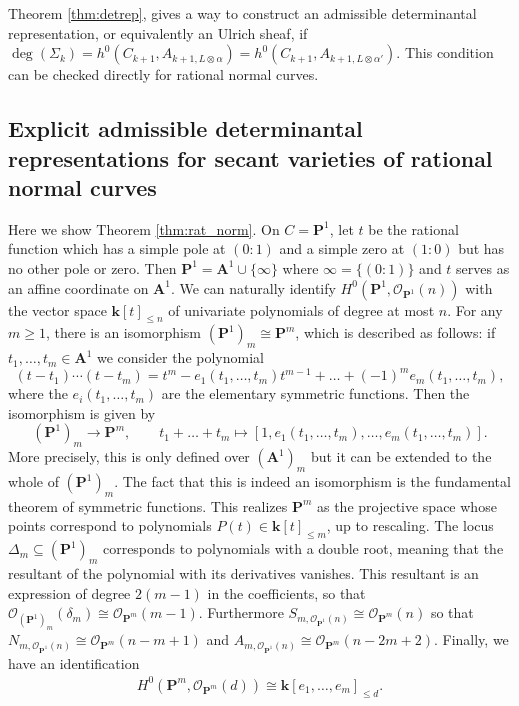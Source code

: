 \documentclass[12pt]{amsart}
\numberwithin{equation}{section}
\numberwithin{thmcounter}{section}
\theoremstyle{definition}
\theoremstyle{claim}
\newcommand{\kk}{\mathbf{k}}
\newcommand{\nP}{\mathbf{P}}
\newcommand{\nA}{\mathbf{A}}
\newcommand{\sO}{\mathscr{O}}
\begin{document}
Theorem \ref{thm:detrep}, gives a way to construct an admissible determinantal representation, or equivalently an Ulrich sheaf, if  $\deg(\Sigma_k)=h^0(C_{k+1},A_{k+1,L\otimes \alpha})=h^0(C_{k+1},A_{k+1,L\otimes \alpha'})$.  This condition can be checked directly for rational normal curves.





\subsection{Explicit admissible determinantal representations for secant varieties of rational normal curves} \label{subsec:explicitdetrep}
Here we show Theorem \ref{thm:rat_norm}.
On $C = \nP^1$, let $t$ be the rational function which has a simple pole at $(0:1)$ and a simple zero at $(1:0)$ but has no other pole or zero. Then $\nP^1 = \nA^1 \cup \{\infty\}$ where $\infty = \{(0:1)\}$ and $t$ serves as an affine coordinate on $\nA^1$. We can naturally identify $H^0(\nP^1,\sO_{\nP^1}(n))$ with the vector space $\kk[t]_{\leq n}$ of univariate polynomials of degree at most $n$. For any $m\geq 1$, there is an isomorphism $(\nP^1)_m \cong \nP^m$, which is described as follows: if $t_1,\dots,t_m \in \nA^1$ we consider the polynomial
	\[ (t-t_1)\cdots (t-t_m) = t^m - e_1(t_1,\dots,t_m)t^{m-1}+ \dots +(-1)^m e_m(t_1,\dots,t_m), \]
	where the $e_i(t_1,\dots,t_m)$ are the elementary symmetric functions. Then the isomorphism is given by
	\[ (\nP^1)_m \longrightarrow \nP^m, \qquad t_1+\dots+t_m \longmapsto [1,e_1(t_1,\dots,t_m),\dots,e_m(t_1,\dots,t_m)] . \]
	More precisely, this is only defined over $(\nA^1)_m$ but it can be extended to the whole of $(\nP^1)_m$. The fact that this is indeed an isomorphism is the fundamental theorem of symmetric functions.
	This realizes $\nP^m$ as the projective space whose points correspond to polynomials $P(t)\in \kk[t]_{\leq m}$, up to rescaling. The locus $\Delta_m \subseteq (\nP^1)_m$ corresponds to polynomials with a double root, meaning that the resultant of the polynomial with its derivatives vanishes. This resultant is an expression of degree $2(m-1)$ in the coefficients, so that $\sO_{(\nP^1)_m}(\delta_m) \cong \sO_{\nP^m}(m-1)$. Furthermore $S_{m,\sO_{\nP^1}(n)} \cong \sO_{\nP^m}(n)$ so that $N_{m,\sO_{\nP^1}(n)} \cong \sO_{\nP^m}(n-m+1)$ and $A_{m,\sO_{\nP^1}(n)} \cong \sO_{\nP^m}(n-2m+2)$. Finally, we have an identification
	\begin{align*}
		H^0(\nP^m,\sO_{\nP^m}(d)) \cong \kk[e_1,\dots,e_m]_{\leq d}.
	\end{align*}
\end{document}

